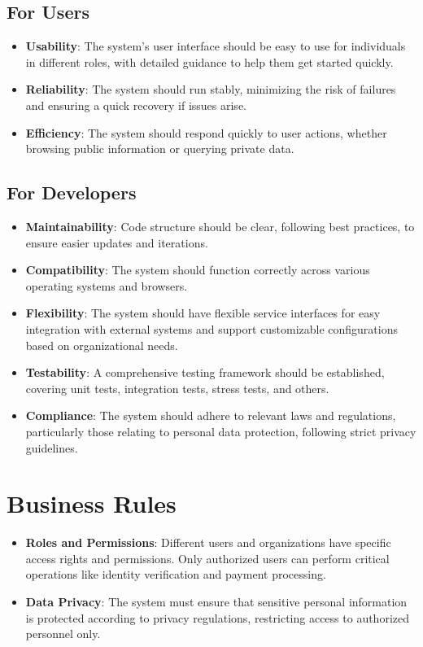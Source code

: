 \subsection{For Users}
\begin{itemize}
    \item \textbf{Usability}: The system's user interface should be easy to use for individuals in different roles, with detailed guidance to help them get started quickly.
    \item \textbf{Reliability}: The system should run stably, minimizing the risk of failures and ensuring a quick recovery if issues arise.
    \item \textbf{Efficiency}: The system should respond quickly to user actions, whether browsing public information or querying private data.
\end{itemize}

\subsection{For Developers}
\begin{itemize}
    \item \textbf{Maintainability}: Code structure should be clear, following best practices, to ensure easier updates and iterations.
    \item \textbf{Compatibility}: The system should function correctly across various operating systems and browsers.
    \item \textbf{Flexibility}: The system should have flexible service interfaces for easy integration with external systems and support customizable configurations based on organizational needs.
    \item \textbf{Testability}: A comprehensive testing framework should be established, covering unit tests, integration tests, stress tests, and others.
    \item \textbf{Compliance}: The system should adhere to relevant laws and regulations, particularly those relating to personal data protection, following strict privacy guidelines.
\end{itemize}

\section{Business Rules}
\begin{itemize}
    \item \textbf{Roles and Permissions}: Different users and organizations have specific access rights and permissions. Only authorized users can perform critical operations like identity verification and payment processing.
    \item \textbf{Data Privacy}: The system must ensure that sensitive personal information is protected according to privacy regulations, restricting access to authorized personnel only.
\end{itemize}



